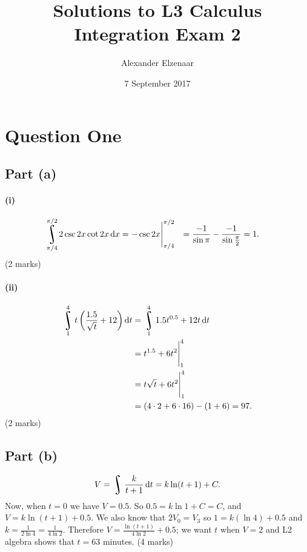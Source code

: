 \documentclass[a4paper]{report}
\title{Solutions to L3 Calculus Integration Exam 2}
\author{Alexander Elzenaar}
\date{7 September 2017}
\DeclareMathOperator*{\rint}{\scalerel*{\rotatebox{17}{$\!\int\!$}}{\int}}
\begin{document}
\maketitle

\section*{Question One}
\subsection*{Part (a)}
\paragraph{(i)}
\begin{align*}
  \rint^{\pi/2}_{\pi/4} 2\csc 2x \cot 2x \dif{x} &= \eval{-\csc 2x}^{\pi/2}_{\pi/4}
                                                 &= \frac{-1}{\sin \pi} - \frac{-1}{\sin \frac{\pi}{2}}
                                                 &= 1.
\end{align*}
(2 marks)

\paragraph{(ii)}
\begin{align*}
  \rint^{4}_1 t \left( \frac{1.5}{\sqrt{t}} + 12 \right) \dif{t} &= \rint^4_1 1.5 t^{0.5} + 12t \dif{t}\\
                                                                 &= \eval{t^{1.5} + 6t^2}_1^4\\
                                                                 &= \eval{t\sqrt{t} + 6t^2}_1^4\\
                                                                 &= (4 \cdot 2 + 6 \cdot 16) - (1 + 6) = 97.
\end{align*}
(2 marks)

\subsection*{Part (b)}
\begin{displaymath}
  V = \rint \frac{k}{t + 1} \dif{t} = k\ln(t + 1) + C.
\end{displaymath}
Now, when $ t = 0 $ we have $ V = 0.5 $. So $ 0.5 = k \ln 1 + C = C $, and $ V = k\ln(t + 1) + 0.5 $.
We also know that $ 2V_0 = V_3 $ so $ 1 = k(\ln 4) + 0.5 $ and $ k = \frac{1}{2\ln 4} = \frac{1}{4\ln 2} $.
Therefore $ V = \frac{\ln(t + 1)}{4\ln 2} + 0.5 $; we want $ t $ when $ V = 2 $ and L2 algebra shows
that $ t = 63 $ minutes.
(4 marks)
\end{document}
